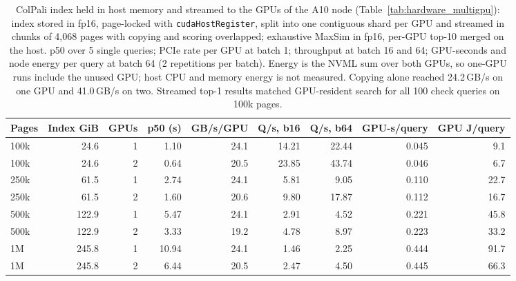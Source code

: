 \begin{table}[t]
\centering
\caption{ColPali index held in host memory and streamed to the GPUs of the A10 node (Table~\ref{tab:hardware_multigpu}): index stored in fp16, page-locked with \texttt{cudaHostRegister}, split into one contiguous shard per GPU and streamed in chunks of 4,068 pages with copying and scoring overlapped; exhaustive MaxSim in fp16, per-GPU top-10 merged on the host. p50 over 5 single queries; PCIe rate per GPU at batch 1; throughput at batch 16 and 64; GPU-seconds and node energy per query at batch 64 (2 repetitions per batch). Energy is the NVML sum over both GPUs, so one-GPU runs include the unused GPU; host CPU and memory energy is not measured. Copying alone reached 24.2\,GB/s on one GPU and 41.0\,GB/s on two. Streamed top-1 results matched GPU-resident search for all 100 check queries on 100k pages.}
\label{tab:host_stream}
\begin{adjustbox}{max width=\linewidth}
\begin{tabular}{lrrrrrrrr}
\toprule
\textbf{Pages} & \textbf{Index GiB} & \textbf{GPUs} & \textbf{p50 (s)} & \textbf{GB/s/GPU} & \textbf{Q/s, b16} & \textbf{Q/s, b64} & \textbf{GPU-s/query} & \textbf{GPU J/query} \\
\midrule
100k & 24.6 & 1 & 1.10 & 24.1 & 14.21 & 22.44 & 0.045 & 9.1 \\
100k & 24.6 & 2 & 0.64 & 20.5 & 23.85 & 43.74 & 0.046 & 6.7 \\
250k & 61.5 & 1 & 2.74 & 24.1 & 5.81 & 9.05 & 0.110 & 22.7 \\
250k & 61.5 & 2 & 1.60 & 20.6 & 9.80 & 17.87 & 0.112 & 16.7 \\
500k & 122.9 & 1 & 5.47 & 24.1 & 2.91 & 4.52 & 0.221 & 45.8 \\
500k & 122.9 & 2 & 3.33 & 19.2 & 4.78 & 8.97 & 0.223 & 33.2 \\
1M & 245.8 & 1 & 10.94 & 24.1 & 1.46 & 2.25 & 0.444 & 91.7 \\
1M & 245.8 & 2 & 6.44 & 20.5 & 2.47 & 4.50 & 0.445 & 66.3 \\
\bottomrule
\end{tabular}
\end{adjustbox}
\end{table}
